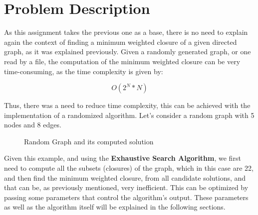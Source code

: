 \documentclass[...]{revdetua}
\begin{document}
\section{ Problem Description}

As this assignment takes the previous one as a base, there is no need to explain again the context of finding a minimum weighted closure of a given directed graph, as it was explained previously. Given a randomly generated graph, or one read by a file, the computation of the minimum weighted closure can be very time-consuming, as the time complexity is given by:

\[
    O(2^N * N)
\]

Thus, there was a need to reduce time complexity, this can be achieved with the implementation of a randomized algorithm.
Let's consider a random graph with 5 nodes and 8 edges.


\begin{figure}[!htb]
    \centering
    \qquad
    \caption{Random Graph and its computed solution}%
    \label{fig:example}%
\end{figure}


Given this example, and using the \textbf{Exhaustive Search Algorithm}, we first need to compute all the subsets (closures) of the graph, which in this case are 22, and then find the minimum weighted closure, from all candidate solutions, and that can be, as previously mentioned, very inefficient. This can be optimized by passing some parameters that control the algorithm's output. These parameters as well as the algorithm itself will be explained in the following sections.
\end{document}
